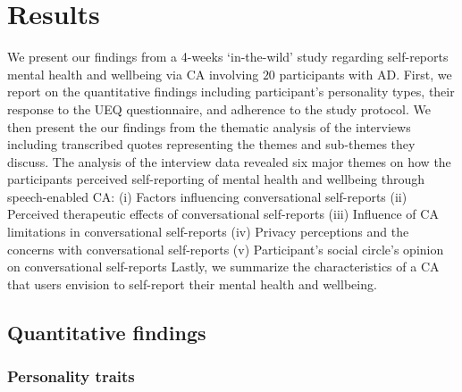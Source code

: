     
    

\section{Results}
    We present our findings from a 4-weeks `in-the-wild' study regarding self-reports mental health and wellbeing via \ac{CA} involving $20$ participants with \ac{AD}.
    First, we report on the quantitative findings including  participant's personality types, their response to the \ac{UEQ} questionnaire, and adherence to the study protocol.
    We then present the our findings from the thematic analysis of the interviews including transcribed quotes representing the themes and sub-themes they discuss. The analysis of the interview data revealed six major themes on how the participants perceived self-reporting of mental health and wellbeing through speech-enabled \ac{CA}: 
        (i) Factors influencing conversational self-reports
        (ii) Perceived therapeutic effects of conversational self-reports 
        (iii) Influence of \ac{CA} limitations in conversational self-reports 
        (iv) Privacy perceptions and the concerns with conversational self-reports
        (v) Participant's social circle's opinion on conversational self-reports
    Lastly, we summarize the characteristics of a \ac{CA} that users envision to self-report their mental health and wellbeing.


    \subsection{Quantitative findings}

    
    \subsubsection{Personality traits} 
        
